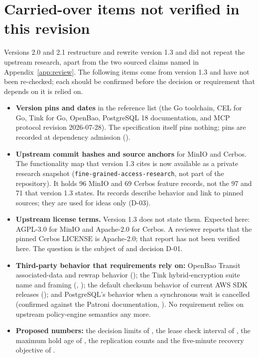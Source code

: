 \section{Carried-over items not verified in this revision}\label{app:unverified}
Versions 2.0 and 2.1 restructure and rewrite version 1.3 and did not repeat the upstream research, apart from the two sourced claims named in Appendix~\ref{app:review}. The following items come from version 1.3 and have not been re-checked; each should be confirmed before the decision or requirement that depends on it is relied on.
\begin{itemize}
\item \textbf{Version pins and dates} in the reference list (the Go toolchain, CEL for Go, Tink for Go, OpenBao, PostgreSQL 18 documentation, and MCP protocol revision 2026-07-28). The specification itself pins nothing; pins are recorded at dependency admission ().
\item \textbf{Upstream commit hashes and source anchors} for MinIO and Cerbos. The functionality map that version 1.3 cites is now available as a private research snapshot (\texttt{fine-grained-access-research}, not part of the repository). It holds 96 MinIO and 69 Cerbos feature records, not the 97 and 71 that version 1.3 states. Its records describe behavior and link to pinned sources; they are used for ideas only (D-03).
\item \textbf{Upstream license terms.} Version 1.3 does not state them. Expected here: AGPL-3.0 for MinIO and Apache-2.0 for Cerbos. A reviewer reports that the pinned Cerbos LICENSE is Apache-2.0; that report has not been verified here. The question is the subject of  and decision D-01.
\item \textbf{Third-party behavior that requirements rely on:} OpenBao Transit associated-data and rewrap behavior (); the Tink hybrid-encryption suite name and framing (, ); the default checksum behavior of current AWS SDK releases (); and PostgreSQL's behavior when a synchronous wait is cancelled (confirmed against the Patroni documentation, ). No requirement relies on upstream policy-engine semantics any more.
\item \textbf{Proposed numbers:} the decision limits of , the lease check interval of , the maximum hold age of , the replication counts and the five-minute recovery objective of .
\end{itemize}


